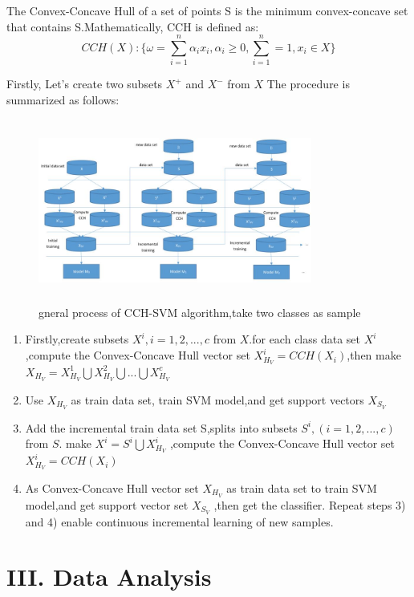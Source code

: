\documentclass[a4paper]{article}
\begin{document}
The Convex-Concave Hull of a set of points S is the minimum convex-concave set that contains S.Mathematically, CCH is defined as:
$$
CCH(X) :\{ \omega = \sum_{i=1} ^{n} \alpha_i x_i, \alpha_i \geq 0, \sum_{i=1} ^{n} = 1, x_i \in X \}
$$

Firstly, Let's create two subsets $X^+$ and $X^-$ from $X$
The procedure is summarized as follows:
\begin{figure}[h]
  \centering
  \includegraphics[width=9cm,height=6cm]{CCH-SVM}
  \caption{gneral process of CCH-SVM algorithm,take two classes as sample}
\end{figure}

\begin{enumerate}
\item Firstly,create subsets $X^i, i= 1,2,...,c$ from $X$.for each class data set $X^{i}$ ,compute the Convex-Concave Hull vector set $X ^{i}_{H_{V}} = CCH(X_i)$,then make  $ X_{H_{V}} =X ^{1}_{H_{V}}  \bigcup X ^{2}_{H_{V}} \bigcup ...\bigcup X ^{c}_{H_{V}} $

\item Use $X_{H_{V}}$ as train data set, train SVM model,and get support vectors $X_{S_{V}}$

\item Add the incremental train data set S,splits into subsets $S^i ,( i= 1,2,...,c)$ from $S$.
make $X^i = S^i \bigcup X^i _{H_{V}}$ ,compute the Convex-Concave Hull vector set $X ^{i}_{H_{V}} = CCH(X_i)$

\item As Convex-Concave Hull vector set $X_{H_{V}}$ as train data set to train SVM model,and get support vector set $X_{S_{V}}$ ,then get the classifier.
Repeat steps 3) and 4) enable continuous incremental learning of new samples.
\end{enumerate}



\section{III. Data Analysis}
\end{document}
